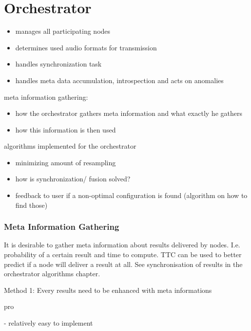 


\chapter{Orchestrator}

\begin{itemize}
	\item manages all participating nodes
	\item determines used audio formats for transmission
	\item handles synchronization task
	\item handles meta data accumulation, introspection and acts on anomalies
\end{itemize}

meta information gathering:

\begin{itemize}
	\item how the orchestrator gathers meta information and what exactly he gathers
	\item how this information is then used
\end{itemize}

algorithms implemented for the orchestrator

\begin{itemize}
	\item minimizing amount of resampling
	\item how is synchronization/ fusion solved?
	\item feedback to user if a non-optimal configuration is found (algorithm on how to find those)
\end{itemize}

\subsection{Meta Information Gathering}
It is desirable to gather meta information about results delivered by nodes. I.e. probability of a certain result and time to compute. TTC can be used to better predict if a node will deliver a result at all. See synchronisation of results in the orchestrator algorithms chapter.

Method 1: Every results need to be enhanced with meta informations

pro

- relatively easy to implement

